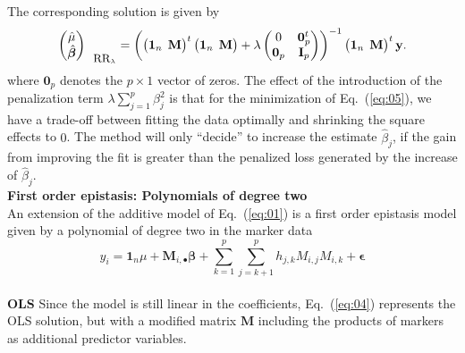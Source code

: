 \documentclass{bmcart}
\newcommand{\M}{\mathbf{M}}
\newcommand{\0}{\mathbf{0}}
\begin{document}
The corresponding solution is given by 
\begin{equation}
	\begin{pmatrix}
		\hat{\mu} \\
		\hat{\bm{\beta}}
	\end{pmatrix}_{\mbox{\small RR}_\lambda} =
	\left( 
	\begin{pmatrix}
		\mathbf{1}_n & \hspace{-0.2cm}\M
	\end{pmatrix}^{t}
	\begin{pmatrix}
		\mathbf{1}_n & \hspace{-0.2cm} \M
	\end{pmatrix} + \lambda \begin{pmatrix}
		0 & \mathbf{0 }_p^t \\
		\mathbf{0 }_p & \mathbf{I}_p
	\end{pmatrix} 
	\right)^{-1} 
	\begin{pmatrix}
		\mathbf{1}_n & \hspace{-0.2cm} \M
	\end{pmatrix}^{t}
	\mathbf{y}. \label{eq:06}
\end{equation}
where $\mathbf{0 }_p$ denotes the $p \times 1$ vector of zeros. The effect of the introduction of the penalization term $\lambda \sum\limits_{j=1}^p {\beta}_j^2$ is that for the minimization of Eq.~(\ref{eq:05}), we have a trade-off between fitting the data optimally and shrinking the square effects to $0$. The method will only ``decide'' to increase the estimate $\hat{\beta}_j$, if the gain from improving the fit is greater than the penalized loss generated by the increase of $\hat{\beta}_j$.  \vspace{0.4cm} \\
{\bf First order epistasis: Polynomials of degree two}\vspace{0.2cm}\\ 
An extension of the additive model of Eq.~(\ref{eq:01}) is a first order epistasis model given by a polynomial of degree two in the marker data \cite{ober15,jiang15,Martini16}
\begin{equation} \label{eq:07}
	y_i =\mathbf{1}_n \mu + \M_{i,\bullet}\bm{\beta} + \sum\limits_{k=1}^p\sum\limits_{j=k+1}^p h_{j,k}M_{i,j}M_{i,k} + \bm{\epsilon}
\end{equation}\vspace{0.1cm}\\
{\bf OLS} Since the model is still linear in the coefficients, Eq.~(\ref{eq:04}) represents the OLS solution, but with a modified matrix $\M$ including the products of markers as additional predictor variables. \vspace{0.4cm}\\
\end{document}
